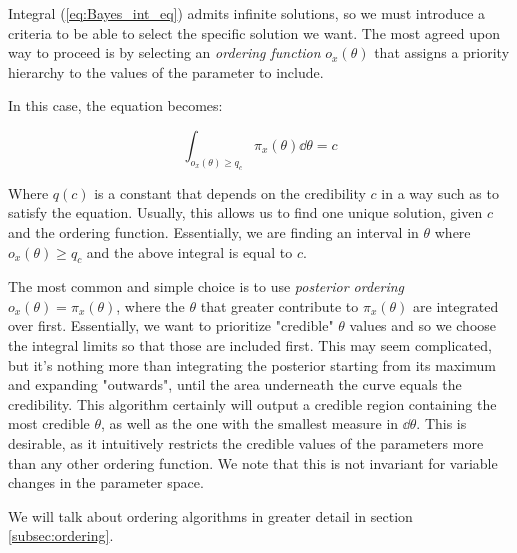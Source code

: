 Integral (\ref{eq:Bayes_int_eq}) admits infinite solutions, so we must introduce a criteria to be able to select the specific solution we want. The most agreed upon way to proceed is by selecting an \emph{ordering function} $o_{x}(\theta)$ that assigns a priority hierarchy to the values of the parameter to include. 

In this case, the equation becomes:
	
	\[
	\int_{o_{x}(\theta)\geq q_c} \pi_x(\theta)\dd \theta = c
	\]

Where $q(c)$ is a constant that depends on the credibility $c$ in a way such as to satisfy the equation. Usually, this allows us to find one unique solution, given $c$ and the ordering function. Essentially, we are finding an interval in $\theta$ where $o_{x}(\theta)\geq q_c$ and the above integral is equal to $c$.

The most common and simple choice is to use \emph{posterior ordering} $o_{x}(\theta) =\pi_x(\theta)$, where the $\theta$ that greater contribute to $\pi_{x}(\theta)$ are integrated over first. Essentially, we want to prioritize "credible" $\theta$ values and so we choose the integral limits so that those are included first. This may seem complicated, but it's nothing more than integrating the posterior starting from its maximum and expanding "outwards", until the area underneath the curve equals the credibility. This algorithm certainly will output a credible region containing the most credible $\theta$, as well as the one with the smallest measure in $\dd\theta$. This is desirable, as it intuitively restricts the credible values of the parameters more than any other ordering function. We note that this is not invariant for variable changes in the parameter space. 

We will talk about ordering algorithms in greater detail in section \ref{subsec:ordering}.

